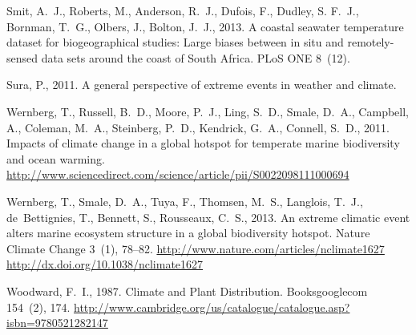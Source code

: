 \documentclass[a4paper,10pt,review]{elsarticle}
\begin{document}
\begin{thebibliography}{50}
Smit, A.~J., Roberts, M., Anderson, R.~J., Dufois, F., Dudley, S. F.~J.,
  Bornman, T.~G., Olbers, J., Bolton, J.~J., 2013. {A coastal seawater
  temperature dataset for biogeographical studies: Large biases between in situ
  and remotely-sensed data sets around the coast of South Africa}. PLoS ONE
  8~(12).

Sura, P., 2011. {A general perspective of extreme events in weather and
  climate}.

Wernberg, T., Russell, B.~D., Moore, P.~J., Ling, S.~D., Smale, D.~A.,
  Campbell, A., Coleman, M.~A., Steinberg, P.~D., Kendrick, G.~A., Connell,
  S.~D., 2011. {Impacts of climate change in a global hotspot for temperate
  marine biodiversity and ocean warming}.
\newline\urlprefix\url{http://www.sciencedirect.com/science/article/pii/S0022098111000694}

Wernberg, T., Smale, D.~A., Tuya, F., Thomsen, M.~S., Langlois, T.~J.,
  de~Bettignies, T., Bennett, S., Rousseaux, C.~S., 2013. {An extreme climatic
  event alters marine ecosystem structure in a global biodiversity hotspot}.
  Nature Climate Change 3~(1), 78--82.
\newline\urlprefix\url{http://www.nature.com/articles/nclimate1627
  http://dx.doi.org/10.1038/nclimate1627}

Woodward, F.~I., 1987. {Climate and Plant Distribution}. Booksgooglecom
  154~(2), 174.
\newline\urlprefix\url{http://www.cambridge.org/us/catalogue/catalogue.asp?isbn=9780521282147}

\end{thebibliography} %
\end{document}
